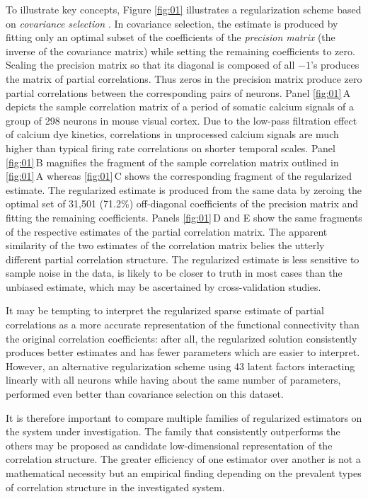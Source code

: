 \documentclass[10pt]{article}
\begin{document}
To illustrate key concepts, Figure \ref{fig:01} illustrates a regularization scheme based on \emph{covariance selection} \cite{Dempster:1972}. In covariance selection, the estimate is produced by fitting only an optimal subset of the coefficients of the \emph{precision matrix} (the inverse of the covariance matrix) while setting the remaining coefficients to zero. Scaling the precision matrix so that its diagonal is composed of all $-1$'s produces the matrix of partial correlations. Thus zeros in the precision matrix produce zero partial correlations between the corresponding pairs of neurons.  Panel \ref{fig:01}\,A depicts the sample correlation matrix of a period of somatic calcium signals of a group of 298 neurons in mouse visual cortex.  Due to the low-pass filtration effect of calcium dye kinetics, correlations in unprocessed calcium signals are much higher than typical firing rate correlations on shorter temporal scales. Panel \ref{fig:01}\,B magnifies the fragment of the sample correlation matrix outlined in \ref{fig:01}\,A whereas \ref{fig:01}\,C shows the corresponding fragment of the regularized estimate. The regularized estimate is produced from the same data by zeroing the optimal set of 31,501 (71.2\%) off-diagonal coefficients of the precision matrix and fitting the remaining coefficients. Panels \ref{fig:01}\,D and E show the same fragments of the respective estimates of the partial correlation matrix. The apparent similarity of the two estimates of the correlation matrix belies the utterly different partial correlation structure. The regularized estimate is less sensitive to sample noise in the data, is likely to be closer to truth in most cases than the unbiased estimate, which may be ascertained by cross-validation studies.

It may be tempting to interpret the regularized sparse estimate of partial correlations as a more accurate representation of the functional connectivity than the original correlation coefficients: after all, the regularized solution consistently produces better estimates and has fewer parameters which are easier to interpret. However, an alternative regularization scheme using 43 latent factors interacting linearly with all neurons while having about the same number of parameters, performed even better than covariance selection on this dataset.

It is therefore important to compare multiple families of regularized estimators on the system under investigation. The family that consistently outperforms the others may be proposed as candidate low-dimensional representation of the correlation structure. The greater efficiency of one estimator over another is not a mathematical necessity but an empirical finding depending on the prevalent types of correlation structure in the investigated system.
\end{document}
